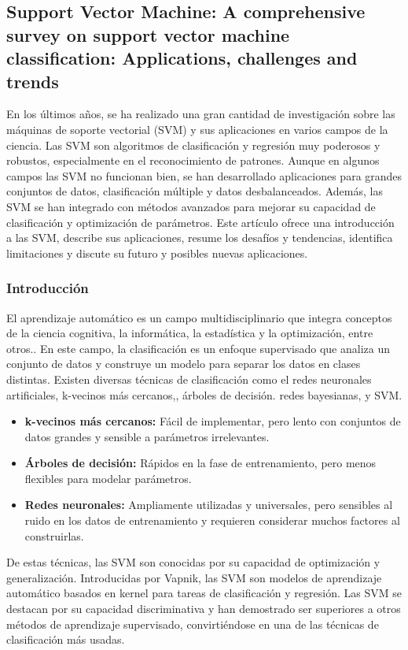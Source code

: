  \subsection{Support Vector Machine: A comprehensive survey on support vector machine classification: Applications, challenges and trends \citep*{tecnica3}}
 En los últimos años, se ha realizado una gran cantidad de investigación sobre las máquinas de soporte vectorial (SVM) y sus aplicaciones en varios campos de la ciencia. Las SVM son algoritmos de clasificación y regresión muy poderosos y robustos, especialmente en el reconocimiento de patrones. Aunque en algunos campos las SVM no funcionan bien, se han desarrollado aplicaciones para grandes conjuntos de datos, clasificación múltiple y datos desbalanceados. Además, las SVM se han integrado con métodos avanzados para mejorar su capacidad de clasificación y optimización de parámetros. Este artículo ofrece una introducción a las SVM, describe sus aplicaciones, resume los desafíos y tendencias, identifica limitaciones y discute su futuro y posibles nuevas aplicaciones.
 \subsubsection{Introducción}
 El aprendizaje automático es un campo multidisciplinario que integra conceptos de la ciencia cognitiva, la informática, la estadística y la optimización, entre otros.. En este campo, la clasificación es un enfoque supervisado que analiza un conjunto de datos y construye un modelo para separar los datos en clases distintas. Existen diversas técnicas de clasificación como el redes neuronales artificiales, k-vecinos más cercanos,, árboles de decisión. redes bayesianas,  y SVM.
 
 \begin{itemize}
 	\item \textbf{k-vecinos más cercanos:} Fácil de implementar, pero lento con conjuntos de datos grandes y sensible a parámetros irrelevantes.
 	\item \textbf{Árboles de decisión:} Rápidos en la fase de entrenamiento, pero menos flexibles para modelar parámetros.
 	\item \textbf{ Redes neuronales:} Ampliamente utilizadas y universales, pero sensibles al ruido en los datos de entrenamiento y requieren considerar muchos factores al construirlas.
\end{itemize}
 De estas técnicas, las SVM son conocidas por su capacidad de optimización y generalización. Introducidas por Vapnik, las SVM son modelos de aprendizaje automático basados en kernel para tareas de clasificación y regresión. Las SVM se destacan por su capacidad discriminativa y han demostrado ser superiores a otros métodos de aprendizaje supervisado, convirtiéndose en una de las técnicas de clasificación más usadas.
 
